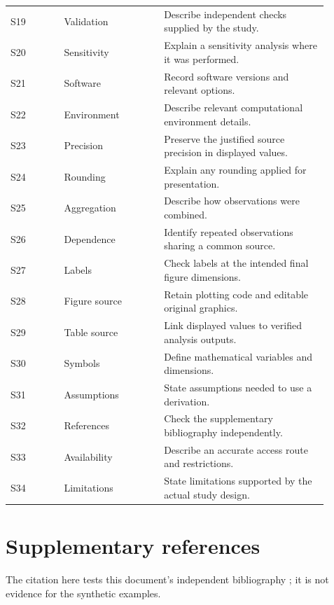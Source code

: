 \documentclass[11pt]{article}
\begin{document}
\begin{longtable}{@{}p{0.15\linewidth}p{0.29\linewidth}p{0.46\linewidth}@{}}
S19 & Validation & Describe independent checks supplied by the study.\\
S20 & Sensitivity & Explain a sensitivity analysis where it was performed.\\
S21 & Software & Record software versions and relevant options.\\
S22 & Environment & Describe relevant computational environment details.\\
S23 & Precision & Preserve the justified source precision in displayed values.\\
S24 & Rounding & Explain any rounding applied for presentation.\\
S25 & Aggregation & Describe how observations were combined.\\
S26 & Dependence & Identify repeated observations sharing a common source.\\
S27 & Labels & Check labels at the intended final figure dimensions.\\
S28 & Figure source & Retain plotting code and editable original graphics.\\
S29 & Table source & Link displayed values to verified analysis outputs.\\
S30 & Symbols & Define mathematical variables and dimensions.\\
S31 & Assumptions & State assumptions needed to use a derivation.\\
S32 & References & Check the supplementary bibliography independently.\\
S33 & Availability & Describe an accurate access route and restrictions.\\
S34 & Limitations & State limitations supported by the actual study design.\\
\end{longtable}
\normalsize

\section{Supplementary references}
The citation here tests this document's independent bibliography
\cite{wilkinson2016fair}; it is not evidence for the synthetic examples.


\end{document}
